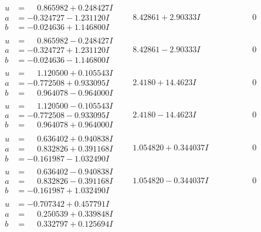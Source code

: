 \documentclass[1p]{elsarticle_modified}
\theoremstyle{definition}
\begin{document}
$$\begin{array}{c|c|c}
\begin{aligned}
u &= \phantom{-}0.865982 + 0.248427 I \\
a &= -0.324727 - 1.231120 I \\
b &= -0.024636 + 1.146800 I\end{aligned}
 & \phantom{-}8.42861 + 2.90333 I & \phantom{-0.000000 } 0 \\ \hline\begin{aligned}
u &= \phantom{-}0.865982 - 0.248427 I \\
a &= -0.324727 + 1.231120 I \\
b &= -0.024636 - 1.146800 I\end{aligned}
 & \phantom{-}8.42861 - 2.90333 I & \phantom{-0.000000 } 0 \\ \hline\begin{aligned}
u &= \phantom{-}1.120500 + 0.105543 I \\
a &= -0.772508 + 0.933095 I \\
b &= \phantom{-}0.964078 - 0.964000 I\end{aligned}
 & \phantom{-}2.4180 + 14.4623 I & \phantom{-0.000000 } 0 \\ \hline\begin{aligned}
u &= \phantom{-}1.120500 - 0.105543 I \\
a &= -0.772508 - 0.933095 I \\
b &= \phantom{-}0.964078 + 0.964000 I\end{aligned}
 & \phantom{-}2.4180 - 14.4623 I & \phantom{-0.000000 } 0 \\ \hline\begin{aligned}
u &= \phantom{-}0.636402 + 0.940838 I \\
a &= \phantom{-}0.832826 + 0.391168 I \\
b &= -0.161987 - 1.032490 I\end{aligned}
 & \phantom{-}1.054820 + 0.344037 I & \phantom{-0.000000 } 0 \\ \hline\begin{aligned}
u &= \phantom{-}0.636402 - 0.940838 I \\
a &= \phantom{-}0.832826 - 0.391168 I \\
b &= -0.161987 + 1.032490 I\end{aligned}
 & \phantom{-}1.054820 - 0.344037 I & \phantom{-0.000000 } 0 \\ \hline\begin{aligned}
u &= -0.707342 + 0.457791 I \\
a &= \phantom{-}0.250539 + 0.339848 I \\
b &= \phantom{-}0.332797 + 0.125694 I\end{aligned}

\end{array}$$
\end{document}
